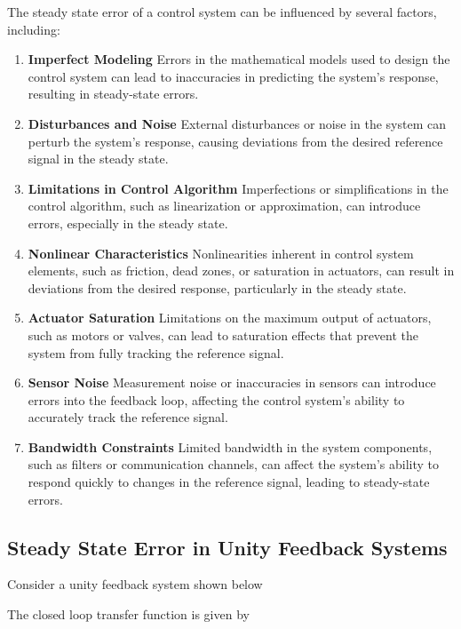 \documentclass[
  14pt,
  a4paper,
  oneside,
  open=any,
  a4paper,
  14pt]{report}
\begin{document}
The steady state error of a control system can be influenced by several
factors, including:

\begin{enumerate}
\def\labelenumi{\arabic{enumi}.}
\item
  \textbf{Imperfect Modeling} Errors in the mathematical models used to
  design the control system can lead to inaccuracies in predicting the
  system's response, resulting in steady-state errors.
\item
  \textbf{Disturbances and Noise} External disturbances or noise in the
  system can perturb the system's response, causing deviations from the
  desired reference signal in the steady state.
\item
  \textbf{Limitations in Control Algorithm} Imperfections or
  simplifications in the control algorithm, such as linearization or
  approximation, can introduce errors, especially in the steady state.
\item
  \textbf{Nonlinear Characteristics} Nonlinearities inherent in control
  system elements, such as friction, dead zones, or saturation in
  actuators, can result in deviations from the desired response,
  particularly in the steady state.
\item
  \textbf{Actuator Saturation} Limitations on the maximum output of
  actuators, such as motors or valves, can lead to saturation effects
  that prevent the system from fully tracking the reference signal.
\item
  \textbf{Sensor Noise} Measurement noise or inaccuracies in sensors can
  introduce errors into the feedback loop, affecting the control
  system's ability to accurately track the reference signal.
\item
  \textbf{Bandwidth Constraints} Limited bandwidth in the system
  components, such as filters or communication channels, can affect the
  system's ability to respond quickly to changes in the reference
  signal, leading to steady-state errors.
\end{enumerate}

\subsection{Steady State Error in Unity Feedback
Systems}\label{steady-state-error-in-unity-feedback-systems}

Consider a unity feedback system shown below

The closed loop transfer function is given by
\end{document}

